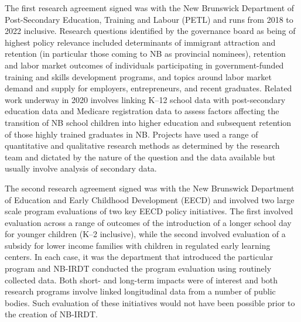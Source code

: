 \documentclass[
]{WileySix}
\begin{document}
The first research agreement signed was with the New Brunswick Department of Post-Secondary Education, Training and Labour (PETL) and runs from 2018 to 2022 inclusive. Research questions identified by the governance board as being of highest policy relevance included determinants of immigrant attraction and retention (in particular those coming to NB as provincial nominees), retention and labor market outcomes of individuals participating in government-funded training and skills development programs, and topics around labor market demand and supply for employers, entrepreneurs, and recent graduates. Related work underway in 2020 involves linking K--12 school data with post-secondary education data and Medicare registration data to assess factors affecting the transition of NB school children into higher education and subsequent retention of those highly trained graduates in NB. Projects have used a range of quantitative and qualitative research methods as determined by the research team and dictated by the nature of the question and the data available but usually involve analysis of secondary data.

The second research agreement signed was with the New Brunswick Department of Education and Early Childhood Development (EECD) and involved two large scale program evaluations of two key EECD policy initiatives. The first involved evaluation across a range of outcomes of the introduction of a longer school day for younger children (K--2 inclusive), while the second involved evaluation of a subsidy for lower income families with children in regulated early learning centers. In each case, it was the department that introduced the particular program and NB-IRDT conducted the program evaluation using routinely collected data. Both short- and long-term impacts were of interest and both research programs involve linked longitudinal data from a number of public bodies. Such evaluation of these initiatives would not have been possible prior to the creation of NB-IRDT.
\end{document}
